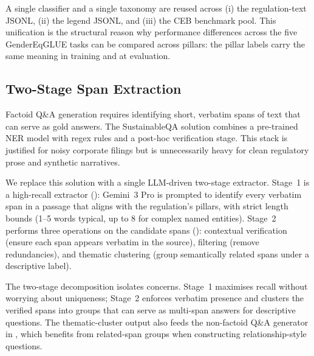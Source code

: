 \documentclass[pdflatex, sn-apa]{sn-jnl}%
\theoremstyle{thmstyleone}%
\theoremstyle{thmstyletwo}%
\theoremstyle{thmstylethree}%
\begin{document}
A single classifier and a single taxonomy are reused across (i) the
regulation-text JSONL, (ii) the legend JSONL, and (iii) the CEB benchmark pool.
This unification is the structural reason why performance differences across the
five GenderEqGLUE tasks can be compared across pillars: the pillar labels carry
the same meaning in training and at evaluation. 

\subsection{Two-Stage Span Extraction}
\label{sec:method:spans}

Factoid Q\&A generation requires identifying short, verbatim spans of text that
can serve as gold answers. The SustainableQA solution combines a pre-trained NER
model with regex rules and a post-hoc verification stage. This stack is
justified for noisy corporate filings but is unnecessarily heavy for clean
regulatory prose and synthetic narratives.

We replace this solution with a single LLM-driven two-stage extractor. Stage~1
is a high-recall extractor (): Gemini~3 Pro is prompted
to identify every verbatim span in a passage that aligns with the regulation's
pillars, with strict length bounds (1--5 words typical, up to 8 for complex
named entities). Stage~2 performs three operations on the candidate spans
(): contextual verification (ensure each span appears
verbatim in the source), filtering (remove redundancies), and thematic
clustering (group semantically related spans under a descriptive label).


The two-stage decomposition isolates concerns. Stage~1 maximises recall without
worrying about uniqueness; Stage~2 enforces verbatim presence and clusters the
verified spans into groups that can serve as multi-span answers for descriptive
questions. The thematic-cluster output also feeds the non-factoid Q\&A generator
in , which benefits from related-span groups when
constructing relationship-style questions.
\end{document}
